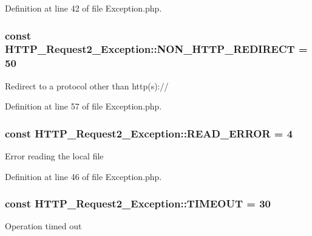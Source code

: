Definition at line 42 of file Exception.\-php.

\hypertarget{classHTTP__Request2__Exception_a9e2ad085db3df15cf825d54e14086b98}{
\subsubsection[{N\-O\-N\-\_\-\-H\-T\-T\-P\-\_\-\-R\-E\-D\-I\-R\-E\-C\-T}]{\setlength{\rightskip}{0pt plus 5cm}const H\-T\-T\-P\-\_\-\-Request2\-\_\-\-Exception\-::\-N\-O\-N\-\_\-\-H\-T\-T\-P\-\_\-\-R\-E\-D\-I\-R\-E\-C\-T = 50}}\label{classHTTP__Request2__Exception_a9e2ad085db3df15cf825d54e14086b98}
Redirect to a protocol other than http(s)\-:// 

Definition at line 57 of file Exception.\-php.

\hypertarget{classHTTP__Request2__Exception_a9167d1901f61ab9f5ec9271b41fe340e}{
\subsubsection[{R\-E\-A\-D\-\_\-\-E\-R\-R\-O\-R}]{\setlength{\rightskip}{0pt plus 5cm}const H\-T\-T\-P\-\_\-\-Request2\-\_\-\-Exception\-::\-R\-E\-A\-D\-\_\-\-E\-R\-R\-O\-R = 4}}\label{classHTTP__Request2__Exception_a9167d1901f61ab9f5ec9271b41fe340e}
Error reading the local file 

Definition at line 46 of file Exception.\-php.

\hypertarget{classHTTP__Request2__Exception_a9eff2e63fc4d2ac0e2692610c7709ac9}{
\subsubsection[{T\-I\-M\-E\-O\-U\-T}]{\setlength{\rightskip}{0pt plus 5cm}const H\-T\-T\-P\-\_\-\-Request2\-\_\-\-Exception\-::\-T\-I\-M\-E\-O\-U\-T = 30}}\label{classHTTP__Request2__Exception_a9eff2e63fc4d2ac0e2692610c7709ac9}
Operation timed out 

